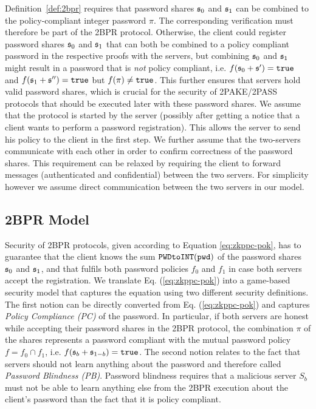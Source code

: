 \noindent
Definition~\ref{def:2bpr} requires that password shares $\mathfrak{s}_0$ and $\mathfrak{s}_1$ can be combined to the policy-compliant integer password $\pi$. The corresponding verification must therefore be part of the 2BPR protocol. 
Otherwise, the client could register password shares $\mathfrak{s}_0$ and $\mathfrak{s}_1$ that can both be combined to a policy compliant password in the respective proofs with the servers, but combining $\mathfrak{s}_0$ and $\mathfrak{s}_1$ might result in a password that is \emph{not} policy compliant, i.e. $f(\mathfrak{s}_0+\mathfrak{s}')=\mathtt{true}$ and $f(\mathfrak{s}_1+\mathfrak{s}'')=\mathtt{true}$ but $f(\pi)\not=\mathtt{true}$.
This further ensures that servers hold valid password shares, which is crucial for the security of 2PAKE/2PASS protocols that should be executed later with these password shares.
We assume that the protocol is started by the server (possibly after getting a notice that a client wants to perform a password registration).
This allows the server to send his policy to the client in the first step.
We further assume that the two-servers communicate with each other in order to confirm correctness of the password shares.
This requirement can be relaxed by requiring the client to forward messages (authenticated and confidential) between the two servers.
For simplicity however we assume direct communication between the two servers in our model.


\subsection{2BPR Model}\label{sec:securitymodel}
Security of 2BPR protocols, given according to Equation \ref{eq:zkppc-pok}, has to guarantee that the client knows the sum $\texttt{PWDtoINT}(\mathtt{pwd})$ of the password shares $\mathfrak{s}_0$ and $\mathfrak{s}_1$, and that \pwd fulfils both password policies $f_0$ and $f_1$ in case both servers accept the registration.
We translate Eq. (\ref{eq:zkppc-pok}) into a game-based security model that captures the equation using two different security definitions.
The first notion can be directly converted from Eq. (\ref{eq:zkppc-pok}) and captures \emph{Policy Compliance (PC)} of the password.
In particular, if both servers are honest while accepting their password shares in the 2BPR protocol, the combination $\pi$ of the shares represents a password compliant with the mutual password policy $f=f_0\cap f_1$, i.e. $f(\mathfrak{s}_b+\mathfrak{s}_{1-b})=\mathtt{true}$.
The second notion relates to the fact that servers should not learn anything about the password and therefore called \emph{Password Blindness (PB)}.
Password blindness requires that a malicious server $S_b$ must not be able to learn anything else from the 2BPR execution about the client's password than the fact that it is policy compliant.

